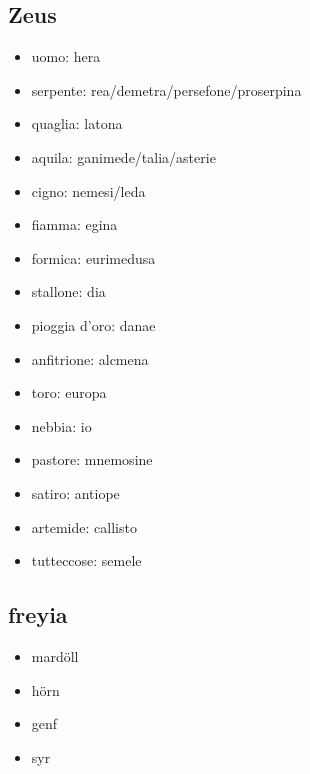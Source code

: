 \documentclass[danish,a4paper,12pt]{article}
\begin{document}
\subsection*{Zeus}
\begin{itemize}
  \item[] uomo: hera
  \item[] serpente: rea/demetra/persefone/proserpina
  \item[] quaglia: latona
  \item[] aquila: ganimede/talia/asterie
  \item[] cigno: nemesi/leda
  \item[] fiamma: egina
  \item[] formica: eurimedusa
  \item[] stallone: dia
  \item[] pioggia d'oro: danae
  \item[] anfitrione: alcmena
  \item[] toro: europa
  \item[] nebbia: io
  \item[] pastore: mnemosine
  \item[] satiro: antiope
  \item[] artemide: callisto
  \item[] tutteccose: semele
\end{itemize}
\subsection*{freyia}
\begin{itemize}
  \item[] mardöll
   \item[] hörn
  \item[] genf
  \item[] syr
\end{itemize}
\end{document}
